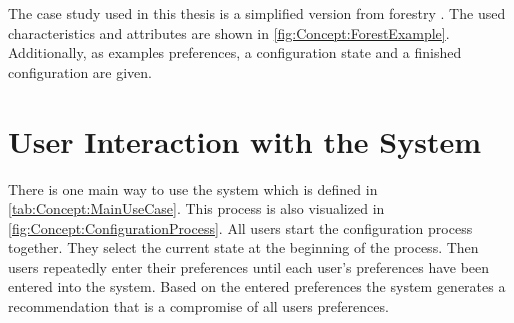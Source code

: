 The case study used in this thesis is a simplified version from forestry .
The used characteristics and attributes are shown in \autoref{fig:Concept:ForestExample}. Additionally, as examples preferences, a configuration state and a finished configuration are given.

\newpage

\section{User Interaction with the System}
\label{sec:Concept:UserSystemInteraction}

There is one main way to use the system which is defined in \autoref{tab:Concept:MainUseCase}. This process is also visualized in \autoref{fig:Concept:ConfigurationProcess}. All users start the configuration process together.
They select the current state at the beginning of the process. Then users repeatedly enter their preferences until each user's preferences have been entered into the system. Based on the entered preferences the system generates a recommendation that is a compromise of all users preferences.

